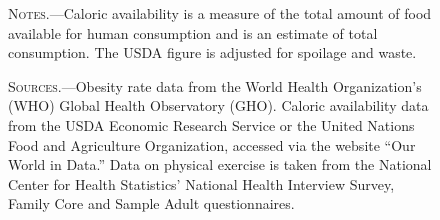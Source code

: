 \documentclass[12pt]{article}
\begin{document}
\begin{figure}[ht]
    \begin{minipage}{\textwidth}
    \bigskip
    
    \footnotesize
    \textsc{Notes.}---Caloric availability is a measure of the total amount of food available for human consumption and is an estimate of total consumption. The USDA figure is adjusted for spoilage and waste.
    
    \bigskip
    \textsc{Sources.}---Obesity rate data from the World Health Organization's (WHO) Global Health Observatory (GHO). Caloric availability data from the USDA Economic Research Service or the United Nations Food and Agriculture Organization, accessed via the website ``Our World in Data.'' Data on physical exercise is taken from the National Center for Health Statistics' National Health Interview Survey, Family Core and Sample Adult questionnaires. 
    \end{minipage}
\end{figure}
\end{document}
